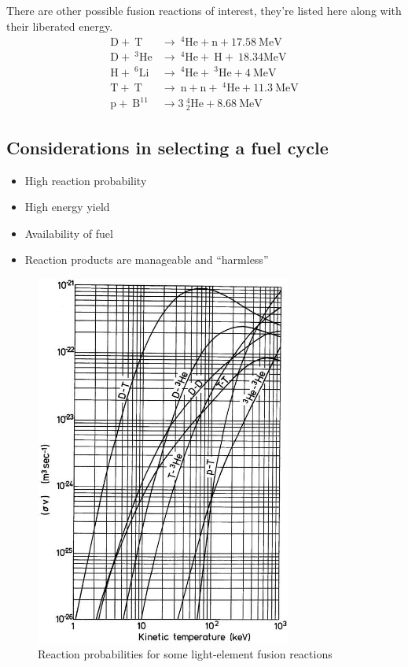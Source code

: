 \documentclass[11pt]{report} %
\begin{document}
There are other possible fusion reactions of interest, they're listed here along with their liberated energy.
\begin{align}
\mathrm{D} +~\mathrm{T}&\xrightarrow{}~^4\mathrm{He}+\mathrm{n}+17.58~\text{MeV} \label{eq:DT}\\
\mathrm{D} +~^3\mathrm{He}&\xrightarrow{}~^4\mathrm{He}+~\mathrm{H}+~18.34\text{MeV}\label{eq:D3He}\\
\mathrm{H} +~^6\mathrm{Li}&\xrightarrow{}~^4\mathrm{He}+~^3\mathrm{He}+4~\text{MeV}\\
\mathrm{T} +~\mathrm{T}&\xrightarrow{}~\mathrm{n}+\mathrm{n}+~^4\mathrm{He}+11.3~\text{MeV}\\
\mathrm{p} +~\mathrm{B}^{11}&\xrightarrow{}3~_2^4\mathrm{He}+8.68~\text{MeV}
\end{align}

\subsection{Considerations in selecting a fuel cycle}
\begin{itemize}
\item High reaction probability
\item High energy yield
\item Availability of fuel
\item Reaction products are manageable and ``harmless''
\end{itemize}

\begin{figure}
\centering
\includegraphics[width=0.75\textwidth]{../images/fusion_rxnrates.jpg} 
\caption{Reaction probabilities for some light-element fusion reactions}
\label{fig:fusion_rxnrates}
\end{figure}
\end{document}
